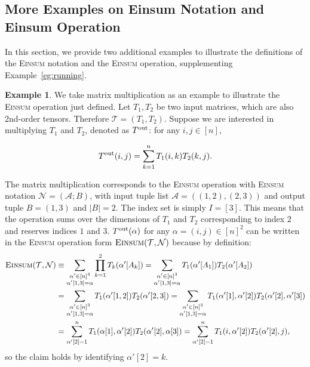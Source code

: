 \documentclass[sn-mathphys, natbib=false]{sn-jnl}
\theoremstyle{plain}
\theoremstyle{definition}
\newtheorem{example}{Example}
\def\Einsum{\textsc{Einsum}}
\newcommand{\tensorcontraction}{\textsc{Einsum}}
\newif\ifshowchanges
\newcommand{\rev}[1]{%
  \ifshowchanges
    {\color{red} #1}%
  \else
    #1%
  \fi
}
\def\calA{\mathcal{A}}
\def\calT{\mathcal{T}}
\def\calN{\mathcal{N}}
\begin{document}
\begin{bibunit}[agsm]

\section{More Examples on Einsum Notation and Einsum Operation}
\label{app:examples}

In this section, we provide two additional examples to illustrate the definitions of the \Einsum{} notation and the \Einsum{} operation, supplementing Example~\ref{eg:running}.

\begin{example}
\label{eg:matrix multiplication}
We take matrix multiplication as an example to illustrate the \Einsum{} operation just defined. Let $T_1, T_2$ be two input matrices, which are also 2nd-order tensors. Therefore $\calT = (T_1, T_2)$. Suppose we are interested in multiplying $T_1$ and $T_2$, denoted as $T^{\rm out}$: for any $i, j \in [n]$, 
\rev{ 
\begin{align*} 
   T^{\rm out} (i, j) = \sum\limits_{k = 1}^n T_{1} (i, k) T_{2} (k, j).
\end{align*}
 }
The matrix multiplication corresponds to the \Einsum{} operation with \Einsum{} notation $\calN = (\calA; B)$, with input tuple list $\calA = ((1,2),(2,3))$ and output tuple $B = (1,3)$ and $|B| = 2$. The index set is simply $I = [3]$. This means that the operation sums over the dimensions of $T_1$ and $T_2$ corresponding to index $2$ and reserves indices $1$ and $3$. $T^{\rm out} (\alpha)$ for any $\alpha = (i, j) \in  [n]^{2}$ can be written in the \Einsum{} operation form $\tensorcontraction(\calT, \calN)$ because by definition:
\begin{align*}
\tensorcontraction(\calT, \calN) & \equiv \sum_{\substack{\alpha'  \in [n]^3 \\ \alpha' [1, 3] = \alpha}} \prod_{k = 1}^{2} T_k (\alpha' [A_k]) = \sum_{\substack{\alpha' 
\in [n]^3 \\ \alpha' [1, 3] = \alpha}} T_1 (\alpha' [A_1]) T_2 (\alpha' [A_2]) \\
& = \sum_{\substack{\alpha'  \in [n]^3 \\ \alpha' [1, 3] = \alpha}} T_1 (\alpha' [1, 2]) T_2 (\alpha' [2, 3]) = \sum_{\substack{\alpha'  \in [n]^3 \\ \alpha' [1, 3] = \alpha}} T_1 (\alpha' [1], \alpha' [2]) T_2 (\alpha' [2], \alpha'[3]) \\
& = \sum_{\alpha' [2] = 1}^{n} T_{1} (\alpha [1], \alpha' [2]) T_{2} (\alpha' [2], \alpha [3]) = \sum_{\alpha' [2] = 1}^{n} T_{1} (i, \alpha' [2]) T_{2} (\alpha' [2], j),
\end{align*}
so the claim holds by identifying $\alpha' [2] = k$.
\end{example}


\end{bibunit}
\end{document}
